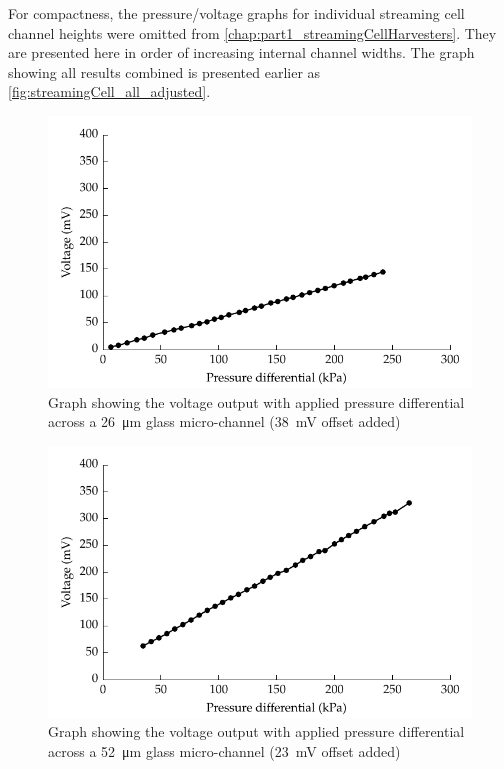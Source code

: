 
For compactness, the pressure/voltage graphs for individual streaming cell channel heights were omitted from \cref{chap:part1_streamingCellHarvesters}.
They are presented here in order of increasing internal channel widths.
The graph showing all results combined is presented earlier as \cref{fig:streamingCell_all_adjusted}.

\begin{figure}[p]
    \centering
    \includegraphics{content/pt1/01-PowerHarvesting/graphics/streamingCell_voltVsPress_26um_out}
    \caption{\label{fig:VvsP_26um}Graph showing the voltage output with applied pressure differential across a \SI{26}{\micro\metre} glass micro-channel (\SI{38}{\milli\volt} offset added)}
\end{figure}

\begin{figure}
    \centering
    \includegraphics{content/pt1/01-PowerHarvesting/graphics/streamingCell_voltVsPress_52um_out}
    \caption{\label{fig:VvsP_52um}Graph showing the voltage output with applied pressure differential across a \SI{52}{\micro\metre} glass micro-channel (\SI{23}{\milli\volt} offset added)}
\end{figure}

